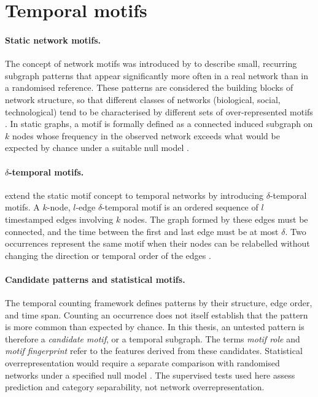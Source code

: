 \section{Temporal motifs}
\label{sec:motifs}

\paragraph{Static network motifs.}
The concept of network motifs was introduced by \citet{milo2002network} to describe small, recurring subgraph patterns that appear significantly more often in a real network than in a randomised reference. These patterns are considered the building blocks of network structure, so that different classes of networks (biological, social, technological) tend to be characterised by different sets of over-represented motifs \citep{milo2002network}. In static graphs, a motif is formally defined as a connected induced subgraph on $k$ nodes whose frequency in the observed network exceeds what would be expected by chance under a suitable null model \citep{milo2002network, newman2010networks}.


\paragraph{$\delta$-temporal motifs.}
\citet{paranjape2017motifs} extend the static motif concept to temporal networks by introducing $\delta$-temporal motifs.
A $k$-node, $l$-edge $\delta$-temporal motif is an ordered sequence of
$l$ timestamped edges involving $k$ nodes. The graph formed by these edges must
be connected, and the time between the first and last edge must be at most
$\delta$. Two occurrences represent the same motif when their nodes can be
relabelled without changing the direction or temporal order of the edges
\citep{paranjape2017motifs}.

\paragraph{Candidate patterns and statistical motifs.}
The temporal counting framework defines patterns by their structure, edge order,
and time span. Counting an occurrence does not itself establish that the pattern
is more common than expected by chance. In this thesis, an untested pattern is
therefore a \emph{candidate motif}, or a temporal subgraph. The terms
\emph{motif role} and \emph{motif fingerprint} refer to the features derived from
these candidates. Statistical overrepresentation would require a separate
comparison with randomised networks under a specified null model
\citep{milo2002network}. The supervised tests used here assess prediction and
category separability, not network overrepresentation.

